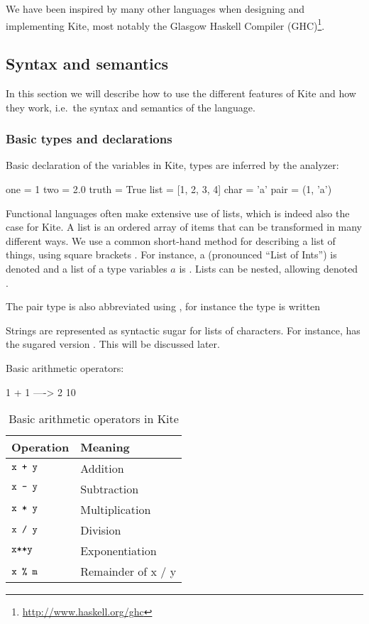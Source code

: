 
We have been inspired by many other languages when designing and implementing Kite, most notably the Glasgow Haskell Compiler (GHC)\footnote{\url{http://www.haskell.org/ghc}}.


\subsection{Syntax and semantics}
In this section we will describe how to use the different features of Kite and how they work, i.e.\ the syntax and semantics of the language.

\subsubsection{Basic types and declarations}
Basic declaration of the variables in Kite, types are inferred by the analyzer:

\begin{kite}
one = 1
two = 2.0
truth = True
list = [1, 2, 3, 4]
char = 'a'
pair = (1, 'a')
\end{kite}

Functional languages often make extensive use of lists, which is indeed also the case for Kite. A list is an ordered array of items that can be transformed in many different ways. We use a common short-hand method for describing a list of things, using square brackets \code{[\ ]}. For instance, a  (pronounced ``List of Ints'') is denoted \code{[Int]} and a list of a type variables $a$ is \code{[a]}. Lists can be nested, allowing  denoted \code{[[Int]]}.

The pair type is also abbreviated using \code{( , )}, for instance the type  is written 

Strings are represented as syntactic sugar for lists of characters. For
instance, \code{['f', 'o', 'o']} has the sugared version . This will be discussed later.

Basic arithmetic operators:
\begin{kite}
1 + 1  ----> 2
10 %
\end{kite}

\begin{table}[H]
  \centering
  \begin{tabular}{ll}
    \textbf{Operation} & \textbf{Meaning}   \\ \hline
    $\texttt{x + y}$     & Addition         \\ \hline
    $\texttt{x - y}$     & Subtraction        \\ \hline
    $\texttt{x * y}$     & Multiplication     \\ \hline
    $\texttt{x / y}$     & Division           \\ \hline
    $\texttt{x**y}$      & Exponentiation     \\ \hline
    $\texttt{x \% m}$    & Remainder of x / y \\ \hline
  \end{tabular}
  \caption{Basic arithmetic operators in Kite}
\label{tbl:kite-design-arith-op}
\end{table}

